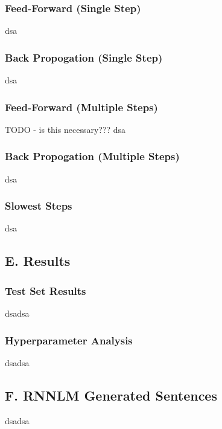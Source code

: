 \documentclass{article}
\begin{document}
\subsubsection*{Feed-Forward (Single Step)}
dsa

\subsubsection*{Back Propogation (Single Step)}
dsa

\subsubsection*{Feed-Forward (Multiple Steps)}
TODO - is this necessary??? dsa

\subsubsection*{Back Propogation (Multiple Steps)}
dsa

\subsubsection*{Slowest Steps}
dsa


\subsection*{E. Results}
\subsubsection*{Test Set Results}
dsadsa

\subsubsection*{Hyperparameter Analysis}
dsadsa


\subsection*{F. \textbf{RNNLM} Generated Sentences }
dsadsa
\end{document}
